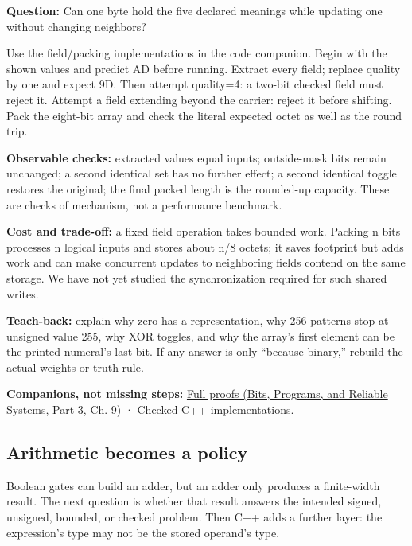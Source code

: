 \hypertarget{01-foundations-i-ch001-test-the-packed-meaning}{}

\textbf{Question:} Can one byte hold the five declared meanings while updating one without changing neighbors?

Use the field/packing implementations in the code companion. Begin with the shown values and predict AD before running. Extract every field; replace quality by one and expect 9D. Then attempt quality=4: a two-bit checked field must reject it. Attempt a field extending beyond the carrier: reject it before shifting. Pack the eight-bit array and check the literal expected octet as well as the round trip.

\textbf{Observable checks:} extracted values equal inputs; outside-mask bits remain unchanged; a second identical set has no further effect; a second identical toggle restores the original; the final packed length is the rounded-up capacity. These are checks of mechanism, not a performance benchmark.

\textbf{Cost and trade-off:} a fixed field operation takes bounded work. Packing n bits processes n logical inputs and stores about n/8 octets; it saves footprint but adds work and can make concurrent updates to neighboring fields contend on the same storage. We have not yet studied the synchronization required for such shared writes.

\textbf{Teach-back:} explain why zero has a representation, why 256 patterns stop at unsigned value 255, why XOR toggles, and why the array's first element can be the printed numeral's last bit. If any answer is only ``because binary,'' rebuild the actual weights or truth rule.

\textbf{Companions, not missing steps:} \href{../01-Bits-Programs-and-Reliable-Systems-P03/main.pdf\#nameddest=01-foundations-i-ch011-m001---positional-value-masks-fields-and-de-morgan}{Full proofs (Bits, Programs, and Reliable Systems, Part 3, Ch. 9)} · \hyperref[appendix-4e2236f53445-m001---width-safe-fields-and-lsb-first-bit-packing]{Checked C++ implementations}.

\subsection{Arithmetic becomes a policy}\label{01-foundations-i-ch001-arithmetic-becomes-a-policy}

\hypertarget{01-foundations-i-ch001-arithmetic-becomes-a-policy}{}

Boolean gates can build an adder, but an adder only produces a finite-width result. The next question is whether that result answers the intended signed, unsigned, bounded, or checked problem. Then C++ adds a further layer: the expression's type may not be the stored operand's type.

